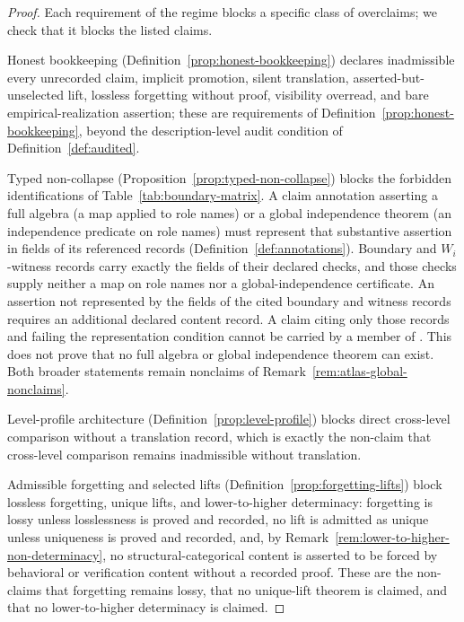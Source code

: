 \begin{proof}
Each requirement of the regime blocks a specific class of overclaims;
we check that it blocks the listed claims.

Honest bookkeeping (Definition~\ref{prop:honest-bookkeeping}) declares
inadmissible every unrecorded claim, implicit promotion, silent
translation, asserted-but-unselected lift, lossless forgetting without
proof, visibility overread, and bare empirical-realization assertion;
these are requirements of Definition~\ref{prop:honest-bookkeeping},
beyond the description-level audit condition of Definition~\ref{def:audited}.

Typed non-collapse (Proposition~\ref{prop:typed-non-collapse}) blocks the
forbidden identifications of Table~\ref{tab:boundary-matrix}. A claim
annotation asserting a full algebra (a map applied to role names) or a global
independence theorem (an independence predicate on role names) must represent
that substantive assertion in fields of its referenced records
(Definition~\ref{def:annotations}). Boundary and \(W_i\)-witness records carry
exactly the fields of their declared checks, and those checks supply neither a
map on role names nor a global-independence certificate. An assertion not represented by the fields of the cited boundary and witness
records requires an additional declared content record. A claim citing only
those records and failing the representation condition cannot be carried by a member of
\FATCD{}. This does not prove that no full
algebra or global independence theorem can exist. Both broader statements remain nonclaims of
Remark~\ref{rem:atlas-global-nonclaims}.

Level-profile architecture (Definition~\ref{prop:level-profile}) blocks
direct cross-level comparison without a translation record, which is
exactly the non-claim that cross-level comparison remains inadmissible
without translation.

Admissible forgetting and selected lifts
(Definition~\ref{prop:forgetting-lifts}) block lossless forgetting,
unique lifts, and lower-to-higher determinacy: forgetting is lossy
unless losslessness is proved and recorded, no lift is admitted as
unique unless uniqueness is proved and recorded, and, by
Remark~\ref{rem:lower-to-higher-non-determinacy}, no structural-categorical
content is asserted to be forced by behavioral or verification content without
a recorded proof. These are
the non-claims that forgetting remains lossy, that no unique-lift
theorem is claimed, and that no lower-to-higher determinacy is claimed.


\end{proof}
